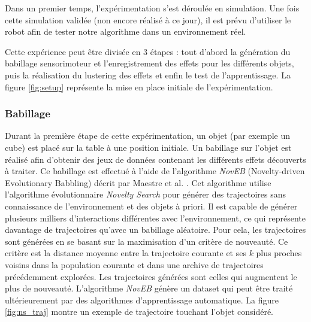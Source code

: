\documentclass{llncs}
\begin{document}
Dans un premier temps, l'expérimentation s'est déroulée en simulation.
Une fois cette simulation validée (non encore réalisé à ce jour), il est prévu d'utiliser le robot afin de tester notre algorithme dans un environnement réel.

Cette expérience peut être divisée en 3 étapes : tout d'abord la génération du babillage sensorimoteur et l'enregistrement des effets pour les différents objets, puis la réalisation du lustering des effets et enfin le test de l'apprentissage.
La figure \ref{fig:setup} représente la mise en place initiale de l'expérimentation.



\subsubsection{Babillage}

Durant la première étape de cette expérimentation, un objet (par exemple un cube) est placé sur la table à une position initiale.
Un babillage sur l'objet est réalisé afin d'obtenir des jeux de données contenant les différents effets découverts à traiter.
Ce babillage est effectué à l'aide de l'algorithme \textit{NovEB} (Novelty-driven Evolutionary Babbling) décrit par Maestre et al. \cite{Maestre2015}.
Cet algorithme utilise l'algorithme évolutionnaire \textit{Novelty Search} \cite{5949955} pour générer des trajectoires sans connaissance de l'environnement et des objets à priori. 
Il est capable de générer plusieurs milliers d'interactions différentes avec l'environnement, ce qui représente davantage de trajectoires qu'avec un babillage aléatoire.
Pour cela, les trajectoires sont générées en se basant sur la maximisation d'un critère de nouveauté.
Ce critère est la distance moyenne entre la trajectoire courante et ses $k$ plus proches voisins dans la population courante et dans une archive de trajectoires précédemment explorées.
Les trajectoires générées sont celles qui augmentent le plus de nouveauté.
L'algorithme \textit{NovEB} génère un dataset qui peut être traité ultérieurement par des algorithmes d'apprentissage automatique.
La figure \ref{fig:ns_traj} montre un exemple de trajectoire touchant l'objet considéré.
\end{document}

